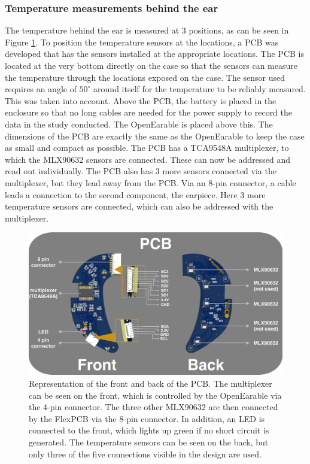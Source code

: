 \subsubsection{Temperature measurements behind the ear}

The temperature behind the ear is measured at 3 positions, as can be seen in Figure \ref{fig:design:pcb_description}.
To position the temperature sensors at the locations, a PCB was developed that has the sensors installed at the appropriate locations. 
The PCB is located at the very bottom directly on the case so that the sensors can measure the temperature through the locations exposed on the case.
The sensor used requires an angle of $ 50 ^ \circ$ around itself for the temperature to be reliably measured. 
This was taken into account.
Above the PCB, the battery is placed in the enclosure so that no long cables are needed for the power supply to record the data in the study conducted.
The OpenEarable is placed above this.
The dimensions of the PCB are exactly the same as the OpenEarable to keep the case as small and compact as possible.
The PCB has a TCA9548A multiplexer, to which the MLX90632 sensors are connected.
These can now be addressed and read out individually.
The PCB also has 3 more sensors connected via the multiplexer, but they lead away from the PCB.
Via an 8-pin connector, a cable leads a connection to the second component, the earpiece.
Here 3 more temperature sensors are connected, which can also be addressed with the multiplexer.

\begin{figure}[t]
    \centering
    \includegraphics[width=\textwidth]{thesis-doc/images/prototype/PCB_Description.png}
    \caption{Representation of the front and back of the PCB. The multiplexer can be seen on the front, which is controlled by the OpenEarable via the 4-pin connector. The three other MLX90632 are then connected by the FlexPCB via the 8-pin connector. In addition, an LED is connected to the front, which lights up green if no short circuit is generated. The temperature sensors can be seen on the back, but only three of the five connections visible in the design are used.}
    \label{fig:design:pcb_description}
\end{figure}

